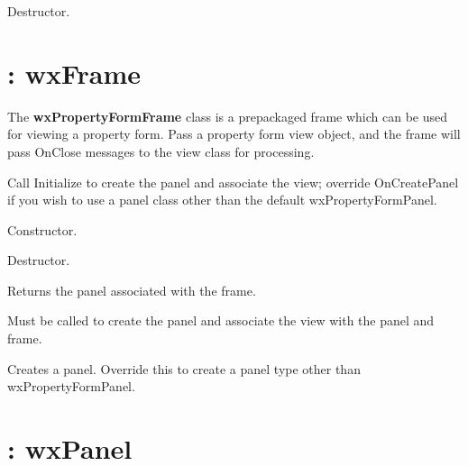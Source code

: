 
Destructor.


\section{: wxFrame}\label{wxpropertyformframe}

The {\bf wxPropertyFormFrame} class is a prepackaged frame which can
be used for viewing a property form. Pass a property form view object, and the frame
will pass OnClose messages to the view class for processing.

Call Initialize to create the panel and associate the view; override OnCreatePanel
if you wish to use a panel class other than the default wxPropertyFormPanel.



Constructor.



Destructor.



Returns the panel associated with the frame.



Must be called to create the panel and associate the view with the panel and frame.



Creates a panel. Override this to create a panel type other than wxPropertyFormPanel.


\section{: wxPanel}\label{wxpropertyformpanel}

